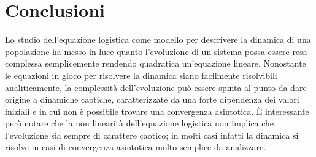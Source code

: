 \section{Conclusioni}
Lo studio dell'equazione logistica come modello per descrivere la dinamica di una popolazione ha messo in luce quanto l'evoluzione di un sistema possa essere resa complessa semplicemente rendendo quadratica un'equazione lineare. Nonostante le equazioni in gioco per risolvere la dinamica siano facilmente risolvibili analiticamente, la complessità dell'evoluzione può essere spinta al punto da dare origine a dinamiche caotiche, caratterizzate da una forte dipendenza dei valori iniziali e in cui non è possibile trovare una convergenza asintotica. È interessante però notare che la non linearità dell'equazione logistica non implica che l'evoluzione sia sempre di carattere caotico; in molti casi infatti la dinamica si risolve in casi di convergenza asintotica molto semplice da analizzare. 